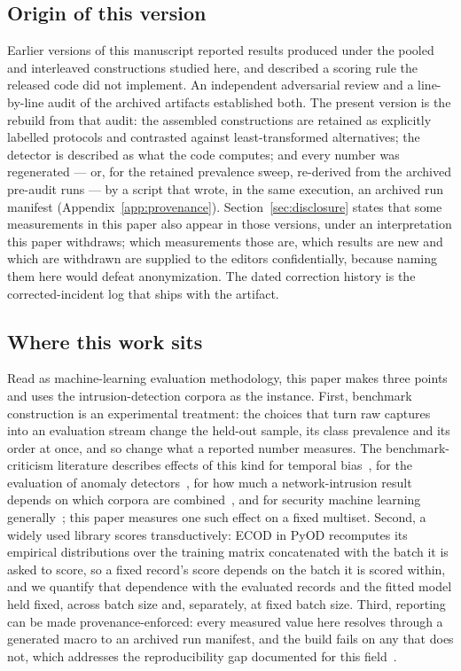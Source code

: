 \documentclass[manuscript,anonymous,review]{acmart}
\begin{document}
\subsection*{Origin of this version}
Earlier versions of this manuscript reported results produced under the pooled
and interleaved constructions studied here, and described a scoring rule the
released code did not implement. An independent adversarial review and a
line-by-line audit of the archived artifacts established both. The present
version is the rebuild from that audit: the assembled constructions are
retained as explicitly labelled protocols and contrasted against
least-transformed alternatives; the detector is described as what the code
computes; and every number was regenerated --- or, for the retained prevalence
sweep, re-derived from the archived pre-audit runs --- by a script that wrote,
in the same execution, an archived run manifest
(Appendix~\ref{app:provenance}).
Section~\ref{sec:disclosure} states that some measurements in this paper also
appear in those versions, under an interpretation this paper withdraws; which
measurements those are, which results are new and which are withdrawn are
supplied to the editors confidentially, because naming them here would defeat
anonymization. The dated correction history is the corrected-incident log that
ships with the artifact.

\subsection*{Where this work sits}
Read as machine-learning evaluation methodology, this paper makes three points
and uses the intrusion-detection corpora as the instance. First, benchmark
construction is an experimental treatment: the choices that turn raw captures
into an evaluation stream change the held-out sample, its class prevalence and
its order at once, and so change what a reported number measures. The
benchmark-criticism literature describes effects of this kind for temporal
bias~\citep{pendlebury2019tesseract}, for the evaluation of anomaly
detectors~\citep{campos2016evaluation,wu2023flawed}, for how much a
network-intrusion result depends on which corpora are
combined~\citep{apruzzese2022crosseval}, and for security machine learning
generally~\citep{arp2022dosdonts,catillo2023hype}; this paper measures one
such effect on a fixed multiset. Second, a widely used library scores
transductively: ECOD in PyOD recomputes its empirical distributions over the
training matrix concatenated with the batch it is asked to score, so a fixed
record's score depends on the batch it is scored within, and we quantify that
dependence with the evaluated records and the fitted model held fixed, across
batch size and, separately, at fixed batch size. Third, reporting can be made
provenance-enforced: every measured value here resolves through a generated
macro to an archived run manifest, and the build fails on any that does not,
which addresses the reproducibility gap documented for this
field~\citep{olszewski2023reproducibility}.
\end{document}
